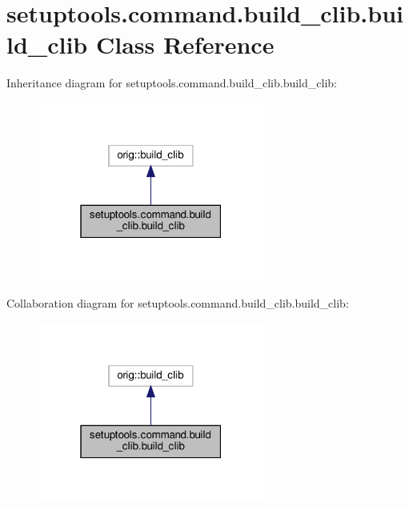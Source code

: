 \hypertarget{classsetuptools_1_1command_1_1build__clib_1_1build__clib}{}\section{setuptools.\+command.\+build\+\_\+clib.\+build\+\_\+clib Class Reference}
\label{classsetuptools_1_1command_1_1build__clib_1_1build__clib}


Inheritance diagram for setuptools.\+command.\+build\+\_\+clib.\+build\+\_\+clib\+:
\nopagebreak
\begin{figure}[H]
\begin{center}
\leavevmode
\includegraphics[width=211pt]{classsetuptools_1_1command_1_1build__clib_1_1build__clib__inherit__graph}
\end{center}
\end{figure}


Collaboration diagram for setuptools.\+command.\+build\+\_\+clib.\+build\+\_\+clib\+:
\nopagebreak
\begin{figure}[H]
\begin{center}
\leavevmode
\includegraphics[width=211pt]{classsetuptools_1_1command_1_1build__clib_1_1build__clib__coll__graph}
\end{center}
\end{figure}
